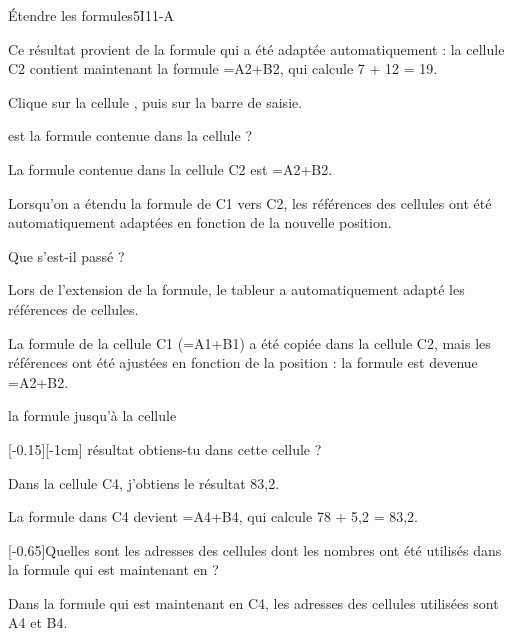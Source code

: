 \begin{EXO}{\'Etendre les formules}{5I11-A}
\begin{MultiColonnes}{2}
\begin{tcbenumerate}[1][2]
\begin{crep}
        Ce résultat provient de la formule qui a été adaptée automatiquement : la cellule C2 contient maintenant la formule =A2+B2, qui calcule 7 + 12 = 19.
        \end{crep}
    \end{tcbenumerate}
\end{MultiColonnes}
    \begin{tcbenumerate}[1][4]    
        \tcbitem {}Clique sur la cellule , puis sur la barre de saisie. 


         est la formule contenue dans la cellule  ?
        \begin{crep}
        La formule contenue dans la cellule C2 est =A2+B2.
        
        Lorsqu'on a étendu la formule de C1 vers C2, les références des cellules ont été automatiquement adaptées en fonction de la nouvelle position.
        \end{crep}
    \end{tcbenumerate}
    \newpage
    \begin{tcbenumerate}[1][5]
        \tcbitem {}Que s'est-il passé ?
        \begin{crep}%
        Lors de l'extension de la formule, le tableur a automatiquement adapté les références de cellules.
        
        La formule de la cellule C1 (=A1+B1) a été copiée dans la cellule C2, mais les références ont été ajustées en fonction de la position : la formule est devenue =A2+B2.
        \end{crep}
        
        \tcbitem {} la formule jusqu'à la cellule 
        
        [-0.15][-1cm] résultat obtiens-tu dans cette cellule ?
        \begin{crep}%
        Dans la cellule C4, j'obtiens le résultat 83,2.
        
        La formule dans C4 devient =A4+B4, qui calcule 78 + 5,2 = 83,2.
        \end{crep}
    \end{tcbenumerate}

    \begin{tcbenumerate}[1][7]
        \tcbitem {}[-0.65]Quelles sont les adresses des cellules dont les nombres ont été utilisés dans la formule qui est maintenant en  ?
        \begin{crep}%
        Dans la formule qui est maintenant en C4, les adresses des cellules utilisées sont A4 et B4.
        

\end{crep}
\end{tcbenumerate}
\end{EXO}
